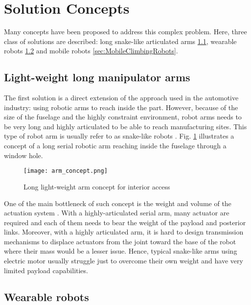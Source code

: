 \section{Solution Concepts}

Many concepts have been proposed to address this complex problem. Here, three class of solutions are described: long snake-like articulated arms \ref{sec:LightWeightLongManipulatorArm}, wearable robots \ref{sec:WearableRobots} and mobile robots \ref{sec:MobileClimbingRobots}.

\subsection{Light-weight long manipulator arms}
\label{sec:LightWeightLongManipulatorArm}

The first solution is a direct extension of the approach used in the automotive industry: using robotic arms to reach inside the part. However, because of the size of the fuselage and the highly constraint environment, robot arms needs to be very long and highly articulated to be able to reach manufacturing sites. This type of robot arm is usually refer to as snake-like robots \cite{buckingham_r._chitrakaran_v._conkie_r._ferguson_g._et_al._snake-arm_2007}. Fig. \ref{fig:arm_concept} illustrates a concept of a long serial robotic arm reaching inside the fuselage through a window hole.

\begin{figure}[H]
	\centering
		\texttt{[image: arm\_concept.png]}
		\caption{Long light-weight arm concept for interior access}
	\label{fig:arm_concept}
\end{figure}

One of the main bottleneck of such concept is the weight and volume of the actuation system \cite{roy_nonlinear_2009}. With a highly-articulated serial arm, many actuator are required and each of them needs to bear the weight of the payload and posterior links. Moreover, with a highly articulated arm, it is hard to design transmission mechanisms to displace actuators from the joint toward the base of the robot where their mass would be a lesser issue. Hence, typical snake-like arms using electric motor usually struggle just to overcome their own weight and have very limited payload capabilities.


\subsection{Wearable robots}
\label{sec:WearableRobots}

